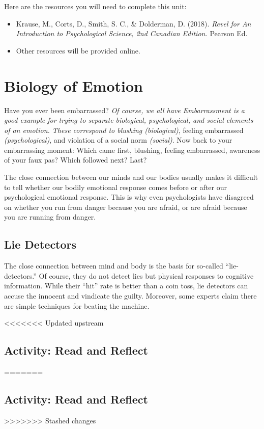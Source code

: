 \documentclass[
]{book}
\providecommand{\tightlist}{%
  \setlength{\itemsep}{0pt}\setlength{\parskip}{0pt}}
\begin{document}
Here are the resources you will need to complete this unit:

\begin{itemize}
\tightlist
\item
  Krause, M., Corts, D., Smith, S. C., \& Dolderman, D. (2018). \emph{Revel for An Introduction to Psychological Science, 2nd Canadian Edition.} Pearson Ed.\\
\item
  Other resources will be provided online.
\end{itemize}

\hypertarget{biology-of-emotion}{%
\section{Biology of Emotion}\label{biology-of-emotion}}

Have you ever been embarrassed? \emph{Of course, we all have Embarrassment is a good example for trying to sepa­rate biological, psychological, and social elements of an emotion. These correspond to blushing (biological)}, feeling embarrassed \emph{(psychological)}, and violation of a social norm \emph{(social)}. Now back to your embarrassing moment: Which came first, blushing, feeling embarrassed, awareness of your faux pas? Which followed next? Last?

The close connection between our minds and our bodies usually makes it difficult to tell whether our bodily emotional response comes before or after our psychological emotional response. This is why even psychologists have disagreed on whether you run from danger because you are afraid, or are afraid because you are running from danger.

\hypertarget{lie-detectors}{%
\subsection*{Lie Detectors}\label{lie-detectors}}

The close connection between mind and body is the basis for so-called ``lie-detectors.'' Of course, they do not detect lies but physical responses to cognitive information. While their ``hit'' rate is better than a coin toss, lie detectors can accuse the in­nocent and vindicate the guilty. Moreover, some experts claim there are simple techniques for beating the ma­chine.

<<<<<<< Updated upstream
\hypertarget{activity-read-and-reflect-11}{%
\subsection*{Activity: Read and Reflect}\label{activity-read-and-reflect-11}}
=======
\hypertarget{activity-read-and-reflect-10}{%
\subsection*{Activity: Read and Reflect}\label{activity-read-and-reflect-10}}
>>>>>>> Stashed changes
\end{document}
